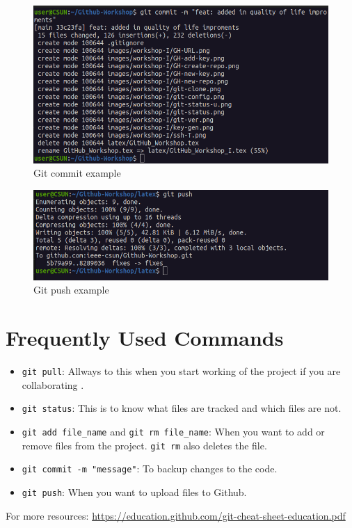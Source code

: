 \documentclass[12pt, a4paper]{article}
\begin{document}
\begin{figure}[H]
\centering
\includegraphics[scale=0.5]{../images/workshop-I/git-commit.png}
\caption{Git commit example}
\end{figure}

\begin{figure}[H]
\centering
\includegraphics[scale=0.5]{../images/workshop-I/git-push.png}
\caption{Git push example}
\end{figure}

\section{Frequently Used Commands}
\begin{itemize}
    \item \verb`git pull`: Allways to this when you start working of the project if you are collaborating .
    \item \verb`git status`: This is to know what files are tracked and which files are not.
    \item \verb`git add file_name` and \verb`git rm file_name`: When you want to add or remove files from the project. \verb`git rm` also deletes the file.
    \item \verb`git commit -m "message"`: To backup changes to the code.
    \item \verb`git push`: When you want to upload files to Github.
\end{itemize}
For more resources: \url{https://education.github.com/git-cheat-sheet-education.pdf}
\clearpage
\end{document}
